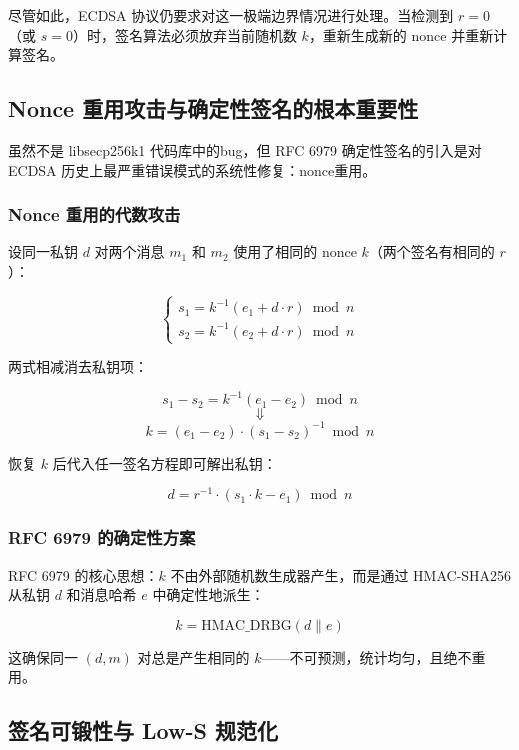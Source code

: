 \documentclass[a4paper,12pt]{ctexart}
\begin{document}
尽管如此，ECDSA 协议仍要求对这一极端边界情况进行处理。当检测到 $r=0$（或 $s=0$）时，签名算法必须放弃当前随机数 $k$，重新生成新的 nonce 并重新计算签名。

\subsection{Nonce 重用攻击与确定性签名的根本重要性}

虽然不是 libsecp256k1 代码库中的bug，但 RFC 6979 确定性签名的引入是对 ECDSA 历史上最严重错误模式的系统性修复：nonce重用。

\subsubsection{Nonce 重用的代数攻击}

设同一私钥 $d$ 对两个消息 $m_1$ 和 $m_2$ 使用了相同的 nonce $k$（两个签名有相同的 $r$）：

\begin{equation}
\begin{cases}
s_1 = k^{-1}(e_1 + d \cdot r) \bmod n \\
s_2 = k^{-1}(e_2 + d \cdot r) \bmod n
\end{cases}
\end{equation}

两式相减消去私钥项：

$$s_1 - s_2 = k^{-1}(e_1 - e_2) \bmod n$$
$$\Downarrow$$
$$k = (e_1 - e_2) \cdot (s_1 - s_2)^{-1} \bmod n$$

恢复 $k$ 后代入任一签名方程即可解出私钥：

$$d = r^{-1} \cdot (s_1 \cdot k - e_1) \bmod n$$

\subsubsection{RFC 6979 的确定性方案}

RFC 6979 的核心思想：$k$ 不由外部随机数生成器产生，而是通过 HMAC-SHA256 从私钥 $d$ 和消息哈希 $e$ 中确定性地派生：

$$k = \text{HMAC\_DRBG}(d \parallel e)$$

这确保同一 $(d, m)$ 对总是产生相同的 $k$——不可预测，统计均匀，且绝不重用。

\subsection{签名可锻性与 Low-S 规范化}
\end{document}
